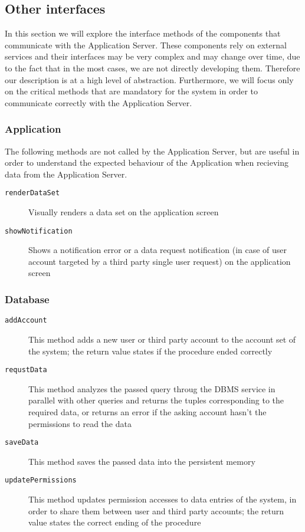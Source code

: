 \documentclass[../DD0.tex]{subfiles}
\begin{document}
  \subsection{Other interfaces}
  \label{sec:otherinterfaces}

    In this section we will explore the interface methods of the components that communicate with the Application Server. These components rely on external services and their interfaces may be very complex and may change over time, due to the fact that in the most cases, we are not directly developing them. Therefore our description is at a high level of abstraction. Furthermore, we will focus only on the critical methods that are mandatory for the system in order to communicate correctly with the Application Server.

    \subsubsection{Application}

      The following methods are not called by the Application Server, but are useful in order to understand the expected behaviour of the Application when recieving data from the Application Server.

      \begin{description}
        \item[\texttt{renderDataSet}] Visually renders a data set on the application screen
        \item[\texttt{showNotification}] Shows a notification error or a data request notification (in case of user account targeted by a third party single user request) on the application screen
      \end{description}

    \subsubsection{Database}

      \begin{description}
        \item[\texttt{addAccount}] This method adds a new user or third party account to the account set of the system; the return value states if the procedure ended correctly
        \item[\texttt{requstData}] This method analyzes the passed query throug the DBMS service in parallel with other queries and returns the tuples corresponding to the required data, or returns an error if the asking account hasn't the permissions to read the data
        \item[\texttt{saveData}] This method saves the passed data into the persistent memory
        \item[\texttt{updatePermissions}] This method updates permission accesses to data entries of the system, in order to share them between user and third party accounts; the return value states the correct ending of the procedure
      \end{description}
\end{document}
